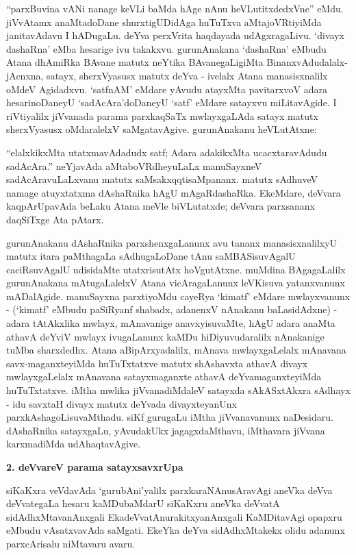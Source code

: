 ``parxBuvina vANi nanage keVLi baMda hAge nAnu heVLutitxdedxVne'' eMdu. jiVvAtamx anaMtadoDane shurxtigUDidAga huTuTxva aMtajoVRtiyiMda janitavAdavu I hADugaLu. deYva perxVrita haqdayada udAgxragaLivu. `divayx dashaRna' eMba hesarige ivu takakxvu. gurunAnakana `dashaRna' eMbudu Atana dhAmiRka BAvane matutx neYtika BAvanegaLigiMta BinanxvAdudalalx-jAcnxna, satayx, sherxVyasusx matutx deYva - ivelalx Atana manasisxnalilx oMdeV Agidadxvu. `satfnAM' eMdare yAvudu atayxMta pavitarxvoV adara hesarinoDaneyU `sadAcAra'doDaneyU `satf' eMdare satayxvu miLitavAgide. I riVtiyalilx jiVvanada parama parxkaqSaTx mwlayxgaLAda satayx matutx sherxVyasusx oMdaralelxV saMgatavAgive. gurunAnakanu heVLutAtxne:

``elalxkikxMta utatxmavAdadudx satf; Adara adakikxMta ucacxtaravAdudu sadAcAra.'' neYjavAda aMtaboVRdheyuLaLx manuSayxneV sadAcAravuLaLxvanu matutx saMsakxqqtisaMpananx. matutx sAdhuveV namage atuyxtatxma dAshaRnika hAgU mAgaRdashaRka. EkeMdare, deVvara kaqpArUpavAda beLaku Atana meVle biVLutatxde; deVvara parxsananx daqSiTxge Ata pAtarx.

gurunAnakanu dAshaRnika parxshenxgaLanunx avu tananx manasisxnalilxyU matutx itara paMthagaLa sAdhugaLoDane tAnu saMBASisuvAgalU caciRsuvAgalU udisidaMte utatxrisutAtx hoVgutAtxne. muMdina BAgagaLalilx gurunAnakana mAtugaLalelxV Atana vicAragaLanunx leVKisuva yatanxvanunx mADalAgide. manuSayxna parxtiyoMdu cayeRya `kimatf' eMdare mwlayxvanunx - (`kimatf' eMbudu paSiRyanf shabadx, adanenxV nAnakanu baLasidAdxne) - adara tAtAkxlika mwlayx, mAnavanige anavxyisuvaMte, hAgU adara anaMta athavA deYviV mwlayx ivugaLanunx kaMDu hiDiyuvudaralilx nAnakanige tuMba sharxdedhx. Atana aBipArxyadalilx, mAnava mwlayxgaLelalx mAnavana savx-maganxteyiMda huTuTxtatxve matutx shAshavxta athavA divayx mwlayxgaLelalx mAnavana satayxmaganxte athavA deYvamaganxteyiMda huTuTxtatxve. iMtha mwlika jiVvanadiMdaleV satayxda sAkASxtAkxra sAdhayx - idu savxtaH divayx matutx deYvada divayxteyanUnx parxkAshagoLisuvaMthadu. siKf gurugaLu iMtha jiVvanavanunx naDesidaru. dAshaRnika satayxgaLu, yAvudakUkx jagagxdaMthavu, iMthavara jiVvana karxmadiMda udAhaqtavAgive.

\smallskip
\begin{center}
{\Large\bf 2. deVvareV parama satayxsavxrUpa}
\end{center}

siKaKxra veVdavAda `gurubAni'yalilx parxkaraNAnusAravAgi aneVka deVva deVvate\-gaLa hesaru kaMDubaMdarU siKaKxru aneVka deVvatA sidAdhxMtavanAnxgali EkadeVvatAnu\-rakitxyanAnxgali KaMDitavAgi opapxru eMbudu vAsatxvavAda saMgati. EkeYka deYva sidAdhxMtakekx olidu adanunx parxcArisalu niMtavaru avaru.

